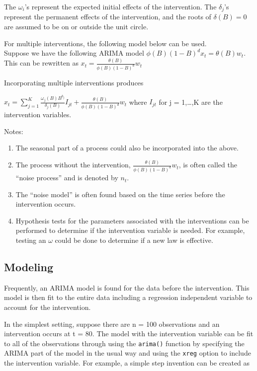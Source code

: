 \documentclass[
]{book}
\providecommand{\tightlist}{%
  \setlength{\itemsep}{0pt}\setlength{\parskip}{0pt}}
\theoremstyle{definition}
\theoremstyle{definition}
\theoremstyle{definition}
\theoremstyle{definition}
\theoremstyle{remark}
\begin{document}
The \(\omega_i\)'s represent the expected initial effects of the intervention. The \(\delta_j\)'s represent the permanent effects of the intervention, and the roots of \(\delta(B) = 0\) are assumed to be on or outside the unit circle.

For multiple interventions, the following model below can be used.\\
Suppose we have the following ARIMA model \(\phi(B)(1-B)^dx_t=\theta(B)w_t\). This can be rewritten as
\(x_t=\frac{\theta(B)}{\phi(B)(1-B)^d}w_t\)

Incorporating multiple interventions produces

\(x_t=\sum_{j=1}^{K}\frac{\omega_j(B)B^{b_j}}{\delta_j(B)}I_{jt}+\frac{\theta(B)}{\phi(B)(1-B)^d}w_t\) where \(I_{jt}\) for j = 1,\ldots,K are the intervention variables.

Notes:

\begin{enumerate}
\def\labelenumi{\arabic{enumi}.}
\tightlist
\item
  The seasonal part of a process could also be incorporated into the above.\\
\item
  The process without the intervention, \(\frac{\theta(B)}{\phi(B)(1-B)^d}w_t\), is often called the ``noise process'' and is denoted by \(n_t\).\\
\item
  The ``noise model'' is often found based on the time series before the intervention occurs.\\
\item
  Hypothesis tests for the parameters associated with the interventions can be performed to determine if the intervention variable is needed. For example, testing an \(\omega\) could be done to determine if a new law is effective.
\end{enumerate}

\hypertarget{modeling}{%
\subsection{Modeling}\label{modeling}}

Frequently, an ARIMA model is found for the data before the intervention. This model is then fit to the entire data including a regression independent variable to account for the intervention.

In the simplest setting, suppose there are n = 100 observations and an intervention occurs at t = 80. The model with the intervention variable can be fit to all of the observations through using the \texttt{arima()} function by specifying the ARIMA part of the model in the usual way and using the \texttt{xreg} option to include the intervention variable. For example, a simple step invention can be created as
\end{document}
